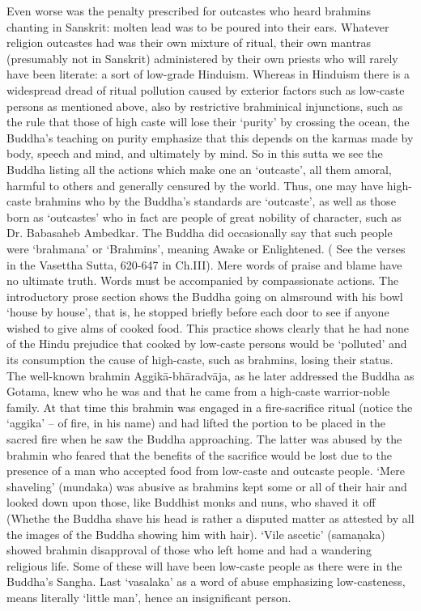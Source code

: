 Even worse was the penalty prescribed for outcastes who heard brahmins chanting in Sanskrit: molten lead was to be poured into their ears. Whatever religion outcastes had was their own mixture of ritual, their own mantras (presumably not in Sanskrit) administered by their own priests who will rarely have been literate: a sort of low-grade Hinduism.
Whereas in Hinduism there is a widespread dread of ritual pollution caused by exterior factors such as low-caste persons as mentioned above, also by restrictive brahminical injunctions, such as the rule that those of high caste will lose their `purity' by crossing the ocean, the Buddha's teaching on purity emphasize that this depends on the karmas made by body, speech and mind, and ultimately by mind. So in this sutta we see the Buddha listing all the actions which make one an `outcaste', all them amoral, harmful to others and generally censured by the world. Thus, one may have high-caste brahmins who by the Buddha's standards are `outcaste', as well as those born as `outcastes' who in fact are people of great nobility of character, such as Dr. Babasaheb Ambedkar. The Buddha did occasionally say that such people were `brahmana' or `Brahmins', meaning Awake or Enlightened. ( See the verses in the Vasettha Sutta, 620-647 in Ch.III). Mere words of praise and blame have no ultimate truth. Words must be accompanied by compassionate actions.
The introductory prose section shows the Buddha going on almsround with his bowl `house by house', that is, he stopped briefly before each door to see if anyone wished to give alms of cooked food. This practice shows clearly that he had none of the Hindu prejudice that cooked by low-caste persons would be `polluted' and its consumption the cause of high-caste, such as brahmins, losing their status. The well-known brahmin Aggik\=a-bh\=aradv\=aja, as he later addressed the Buddha as Gotama, knew who he was and that he came from a high-caste warrior-noble family. At that time this brahmin was engaged in a fire-sacrifice ritual (notice the `aggika' – of fire, in his name) and had lifted the portion to be placed in the sacred fire when he saw the Buddha approaching. The latter was abused by the brahmin who feared that the benefits of the sacrifice would be lost due to the presence of a man who accepted food from low-caste and outcaste people. `Mere shaveling' (mundaka) was abusive as brahmins kept some or all of their hair and looked down upon those, like Buddhist monks and nuns, who shaved it off (Whethe the Buddha shave his head is rather a disputed matter as attested by all the images of the Buddha showing him with hair). `Vile ascetic' (samaṇaka) showed brahmin disapproval of those who left home and had a wandering religious life. Some of these will have been low-caste people as there were in the Buddha's Sangha. Last `vasalaka' as a word of abuse emphasizing low-casteness, means literally `little man', hence an insignificant person.
